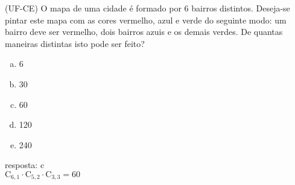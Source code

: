 \begin{ex}
 (UF-CE) O mapa de uma cidade é formado por 6 bairros distintos. Deseja-se pintar este mapa com as cores vermelho, azul e verde do seguinte modo: um bairro deve ser vermelho, dois bairros azuis e os demais verdes. De quantas maneiras distintas isto pode ser feito?
    \begin{enumerate}[(a)]
    \item 6
    \item 30
    \item 60
    \item 120
    \item 240
    \end{enumerate}
      \begin{sol}
       resposta: c \\
       $\mathrm{C}_{6,1}\cdot\mathrm{C}_{5,2}\cdot\mathrm{C}_{3,3}=60$
      \end{sol}
\end{ex}
